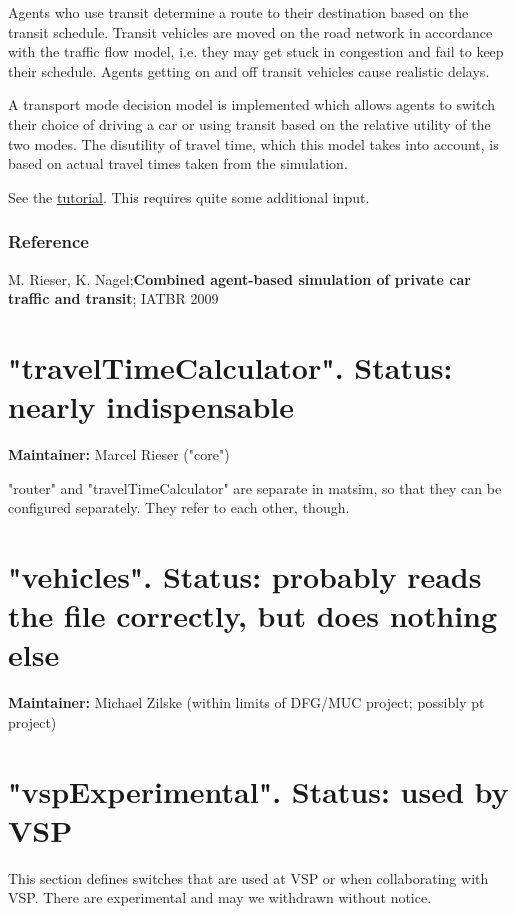 Agents who use transit determine a route to their destination based  on the transit schedule. Transit vehicles are moved on the road network  in accordance with the traffic flow model, i.e. they may get stuck in  congestion and fail to keep their schedule. Agents getting on and off  transit vehicles cause realistic delays.

A transport mode decision model is implemented which allows agents to  switch their choice of driving a car or using transit based on the  relative utility of the two modes. The disutility of travel time, which  this model takes into account, is based on actual travel times taken  from the simulation.

See the \href{http://matsim.org/docs/tutorials/transit}{tutorial}. This requires quite some additional input.

\subsubsection{Reference}

M. Rieser, K. Nagel;\textbf{Combined agent-based simulation of private car traffic and transit}; IATBR 2009

\vfill\eject
\section{"travelTimeCalculator". Status: nearly indispensable}

\textbf{Maintainer:} Marcel Rieser ("core")

"router" and "travelTimeCalculator" are separate in matsim, so that  they can be configured separately. They refer to each other,  though.

\vfill\eject
\section{"vehicles". Status: probably reads the file correctly, but does nothing else}

\textbf{Maintainer:} Michael Zilske (within limits of DFG/MUC project; possibly pt project)

\vfill\eject
\section{"vspExperimental". Status: used by VSP}

This  section defines switches that are used at VSP or when collaborating  with VSP. There are experimental and may we withdrawn without  notice.


